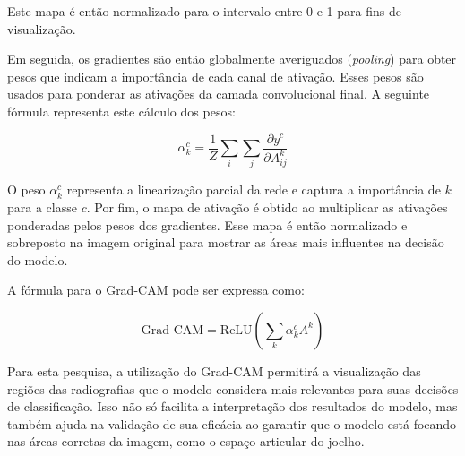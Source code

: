 Este mapa é então normalizado para o intervalo entre 0 e 1 para fins de visualização.

Em seguida, os gradientes são então globalmente averiguados (\textit{pooling}) para obter pesos que indicam a importância de cada canal de ativação. Esses pesos são usados para ponderar as ativações da camada convolucional final. A seguinte fórmula representa este cálculo dos pesos:

\[
\alpha_{k}^{c} = \frac{1}{Z} \sum_i \sum_j \frac{\partial y^{c}}{\partial A_{ij}^{k}}
\]

O peso \( \alpha_{k}^{c} \) representa a linearização parcial da rede e captura a importância de \(k \) para a classe \(c \). Por fim, o mapa de ativação é obtido ao multiplicar as ativações ponderadas pelos pesos dos gradientes. Esse mapa é então normalizado e sobreposto na imagem original para mostrar as áreas mais influentes na decisão do modelo.

A fórmula para o Grad-CAM pode ser expressa como:

\[
\text{Grad-CAM} = \text{ReLU} \left( \sum_{k} \alpha_{k}^{c} A^{k} \right)
\]

Para esta pesquisa, a utilização do Grad-CAM permitirá a visualização das regiões das radiografias que o modelo considera mais relevantes para suas decisões de classificação. Isso não só facilita a interpretação dos resultados do modelo, mas também ajuda na validação de sua eficácia ao garantir que o modelo está focando nas áreas corretas da imagem, como o espaço articular do joelho.